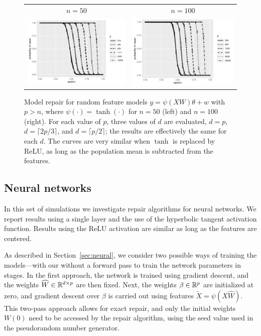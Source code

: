 \begin{figure}[ht]
  \begin{center}
    \begin{tabular}{cc}
      {\scriptsize $n=50$} & {\scriptsize $n=100$} \\
      \includegraphics[width=.47\textwidth]{fig/plot-rf-50} &
      \includegraphics[width=.47\textwidth]{fig/plot-rf-100}\\[-10pt]
    \end{tabular}
  \end{center}
\caption{Model repair for random feature models $y=\psi(XW)\theta + w$ with $p>n$, where $\psi(\cdot) = \tanh(\cdot)$
for $n=50$ (left) and $n=100$ (right). For each value of $p$, three values of $d$ are evaluated, $d=p$, $d=\lceil 2p/3\rceil$,
and $d=\lceil p/2\rceil$; the results are effectively the same for each $d$. The curves are very similar when $\tanh$ is replaced by ReLU, as long as the population mean is subtracted from the features.}
\label{fig:rf}
\end{figure}

\subsection{Neural networks}
\vskip10pt

In this set of simulations we investigate repair algorithms for neural networks. We report results using a single layer and the use of the hyperbolic tangent activation function. Results using the ReLU activation are similar as long as the features are centered.

As described in Section~\ref{sec:neural}, we consider two possible ways of training the models---with our without a forward pass to train the network parameters in stages. In the first approach, the network is trained using gradient descent, and the weights $\widehat W\in\mathbb{R}^{d\times p}$ are then fixed. Next, the weights $\beta\in\mathbb{R}^p$ are initialized at zero, and gradient descent over $\beta$ is carried out using features
$\tilde X = \psi(X\hat W)$. This two-pass approach allows for exact repair, and only the initial weights $W(0)$ need to be accessed by the repair algorithm, using the seed value used in the pseudorandom number generator.

